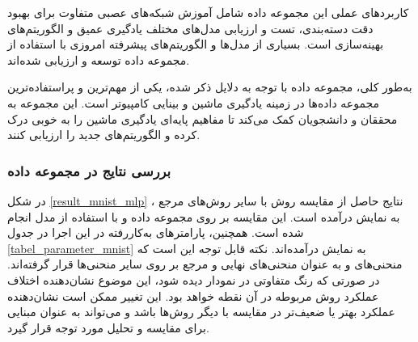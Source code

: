 کاربردهای عملی این مجموعه داده شامل آموزش شبکه‌های عصبی متفاوت برای بهبود دقت دسته‌بندی، تست و ارزیابی مدل‌های مختلف یادگیری عمیق و الگوریتم‌های بهینه‌سازی است. بسیاری از مدل‌ها و الگوریتم‌های پیشرفته امروزی با استفاده از مجموعه داده
توسعه و ارزیابی شده‌اند.

به‌طور کلی، مجموعه داده
با توجه به دلایل ذکر شده، یکی از مهم‌ترین و پراستفاده‌ترین مجموعه داده‌ها در زمینه یادگیری ماشین و بینایی کامپیوتر است. این مجموعه به محققان و دانشجویان کمک می‌کند تا مفاهیم پایه‌ای یادگیری ماشین را به خوبی درک کرده و الگوریتم‌های جدید را ارزیابی کنند.


\vspace{3mm}
\subsubsection{
	بررسی نتایج در مجموعه داده
}\vspace{-1mm}

در شکل
\ref{result_mnist_mlp}%
، نتایج حاصل از مقایسه روش
با سایر روش‌های مرجع به نمایش درآمده است. این مقایسه بر روی مجموعه داده
و با استفاده از مدل
انجام شده است. همچنین، پارامترهای به‌کاررفته در این اجرا در جدول
\ref{tabel_parameter_mnist} 
به نمایش درآمده‌اند. نکته قابل توجه این است که منحنی‌های
و
به عنوان منحنی‌های نهایی و مرجع بر روی سایر منحنی‌ها قرار گرفته‌اند. در صورتی که رنگ متفاوتی در نمودار دیده شود، این موضوع نشان‌دهنده اختلاف عملکرد روش مربوطه در آن نقطه خواهد بود. این تغییر ممکن است نشان‌دهنده عملکرد بهتر یا ضعیف‌تر در مقایسه با دیگر روش‌ها باشد و می‌تواند به عنوان مبنایی برای مقایسه و تحلیل مورد توجه قرار گیرد.



